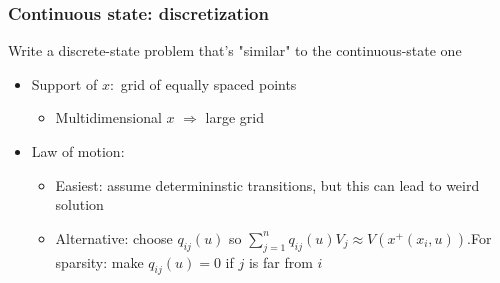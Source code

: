 \documentclass[bigger,handout]{beamer}
\begin{document}
\begin{frame}%
\frametitle{Continuous state: discretization}

Write a discrete-state problem that's "similar" to the continuous-state one

\begin{itemize}
\item Support of $x:$ grid of equally spaced points

\begin{itemize}
\item Multidimensional $x$ $\Rightarrow $ large grid
\end{itemize}

\item Law of motion:

\begin{itemize}
\item Easiest: assume determininstic transitions, but this can lead to weird
solution

\item Alternative: choose $q_{ij}\left( u\right) $ so $\sum%
\nolimits_{j=1}^{n}q_{ij}(u)V_{j}\approx V\left( x^{+}\left( x_{i},u\right)
\right) $.\newline For sparsity: make $q_{ij}\left( u\right) =0$ if $j$ is far from $i$
\end{itemize}
\end{itemize}

\end{frame}%
\end{document}
